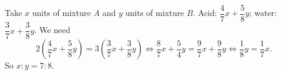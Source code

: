 Take $x$ units of mixture $A$ and $y$ units of mixture $B$. Acid: $\dfrac47x+\dfrac58y$; water: $\dfrac37x+\dfrac38y$. We need
\[2\left(\dfrac47x+\dfrac58y\right)=3\left(\dfrac37x+\dfrac38y\right)\iff\dfrac87x+\dfrac54y=\dfrac97x+\dfrac98y\iff\dfrac18y=\dfrac17x.\]
So $x:y=\boxed{7:8}$.
